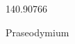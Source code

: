 \documentclass[12pt]{article}
\begin{document}
\hfill{}
\vfill
\begin{center}
  {\fontsize{50}{60}
  }

  \vspace{1em}

  140.90766

Praseodymium
\end{center}
\vfill
\end{document}
